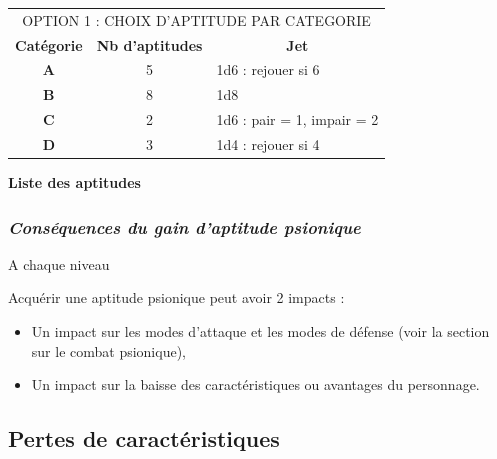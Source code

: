 \documentclass[11pt]{article}
\begin{document}
{\bigskip

\begin{tabular}{ccl}
\multicolumn{3}{c}{OPTION 1 : CHOIX D'APTITUDE PAR CATEGORIE} \\
\textbf{Catégorie} &  \textbf{Nb d'aptitudes} & \multicolumn{1}{c}{\textbf{Jet}} \\
\textbf{A} & 5 & 1d6 : rejouer si 6 \\
\textbf{B} & 8 & 1d8 \\
\textbf{C} & 2 & 1d6 : pair = 1, impair = 2 \\
\textbf{D} & 3 & 1d4 : rejouer si 4 \\
\end{tabular}

\bigskip

\textbf{Liste des aptitudes}

\bigskip



















\subsubsection*{\textit{Conséquences du gain d'aptitude psionique}}

A chaque niveau %

Acquérir une aptitude psionique peut avoir 2 impacts :
\begin{itemize}
\item Un impact sur les modes d'attaque et les modes de défense (voir la section sur le combat psionique),
\item Un impact sur la baisse des caractéristiques ou avantages du personnage.
\end{itemize}

\subsection*{Pertes de caractéristiques}

}
\end{document}
